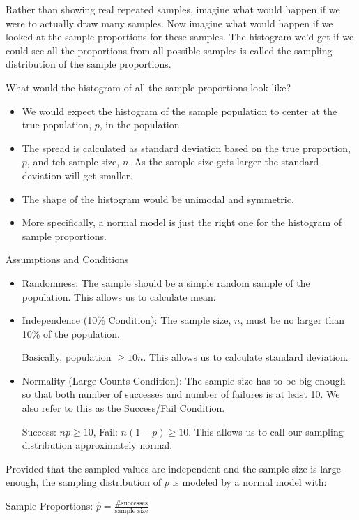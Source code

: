 \documentclass[../stats.tex]{subfiles}
\begin{document}
Rather than showing real repeated samples, imagine what would happen if we were to actually draw many samples. Now imagine what would happen if we looked at the sample proportions for these samples.
The histogram we'd get if we could see all the proportions from all possible samples is called the sampling distribution of the sample proportions.

What would the histogram of all the sample proportions look like?
\begin{itemize}
    \item We would expect the histogram of the sample population to center at the true population, $p$, in the population.
    \item The spread is calculated as standard deviation based on the true proportion, $p$, and teh sample size, $n$. As the sample size gets larger the standard deviation will get smaller.
    \item The shape of the histogram would be unimodal and symmetric.
    \item More specifically, a normal model is just the right one for the histogram of sample proportions.
\end{itemize}

Assumptions and Conditions 
\begin{itemize}
    \item Randomness: The sample should be a simple random sample of the population. This allows us to calculate mean.
    \item Independence (10\% Condition): The sample size, $n$, must be no larger than 10\% of the population. 
    
    Basically, population $\geq 10n$. This allows us to calculate standard deviation.

    \item Normality (Large Counts Condition): The sample size has to be big enough so that both number of successes and number of failures is at least 10. We also refer to this as the Success/Fail Condition.
    
    Success: $np\geq 10$, Fail: $n(1-p)\geq 10$. This allows us to call our sampling distribution approximately normal.
\end{itemize}

Provided that the sampled values are independent and the sample size is large enough, the sampling distribution of $p$ is modeled by a normal model with:

Sample Proportions: $\hat{p}=\frac{\#{\text{successes}}}{\text{sample size}}$
\end{document}
